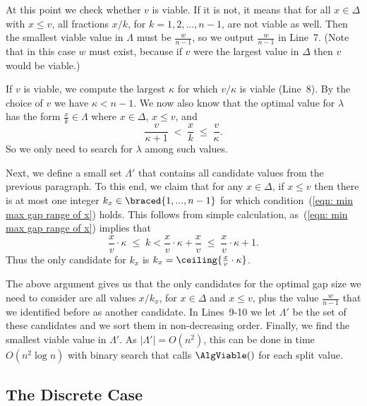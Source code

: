 At this point we check whether $v$ is viable. If it is not, it means that for all $x\in\Delta$ with
$x\le v$, all fractions $x/k$, for $k= 1,2,...,n-1$, are not viable as well. 
Then the smallest viable value in $\Lambda$ must be $\frac{w}{n-1}$, so we output $\frac{w}{n-1}$ in Line~7. 
(Note that in this case $w$ must exist, because if $v$ were the largest value in $\Delta$
then $v$ would be viable.)

If $v$ is viable, we compute the largest $\kappa$ for which $v/\kappa$ is viable (Line~8). By the choice of $v$ we have
$\kappa < n-1$. We now also know that the optimal value for $\lambda$ has the form $\frac{x}{k} \in \Lambda$
where $x\in\Delta$, $x\le v$, and
\begin{equation}
	 \frac{v}{\kappa+1} \;<\; \frac{x}{k} \;\le\; \frac{v}{\kappa}. 
	 \label{eqn: min max gap range of x}
\end{equation}
So we only need to search for $\lambda$ among such values.

Next, we define a small set $\Lambda'$ that contains all candidate values from the previous paragraph.
To this end, we claim that for any $x\in \Delta$, if $x\le v$ then there is at most one integer
$k_x\in\braced{1,...,n-1}$ for which condition~(\ref{eqn: min max gap range of x}) holds. 
This follows from simple calculation, as~(\ref{eqn: min max gap range of x}) implies that
\begin{equation*}
			\frac{x}{v}\cdot \kappa \;\le\; k < \frac{x}{v}\cdot \kappa + \frac{x}{v} \;\le\; \frac{x}{v}\cdot \kappa + 1.
\end{equation*}
Thus the only candidate for $k_x$ is $k_x = \ceiling{\frac{x}{v}\cdot \kappa}$.

The above argument gives us that the only candidates for the optimal gap size we need to consider
are all values  $x/k_x$, for $x\in \Delta$ and $x \le v$, plus the value $\frac{w}{n-1}$ that we identified before
as another candidate.
In Lines~9-10 we let $\Lambda'$ be the set of these candidates and we sort them in non-decreasing order.
Finally, we find the smallest viable value in $\Lambda'$. 
As $|\Lambda'| = O(n^2)$, this can be done in time $O(n^2\log n)$ with binary search that calls $\AlgViable()$ for each split value.




\subsection{The Discrete Case}

